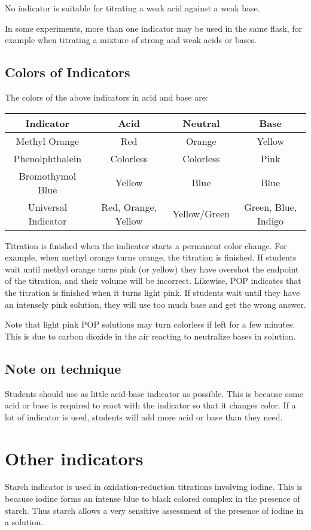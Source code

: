 No indicator is suitable for titrating a weak acid against a weak base.

In some experiments, more than one indicator may be used in the same flask, for example when titrating a mixture of strong and weak acids or bases.

\subsection{Colors of Indicators}
The colors of the above indicators in acid and base are:

\begin{center}
\begin{tabular}{ c | c | c | c |}
\hline
Indicator & Acid & Neutral & Base \\ \hline
Methyl Orange & Red & Orange & Yellow \\ \hline
Phenolphthalein & Colorless & Colorless & Pink \\ \hline
Bromothymol Blue & Yellow & Blue & Blue \\ \hline
Universal Indicator & Red, Orange, Yellow & Yellow/Green & Green, Blue, Indigo  \\
\hline
\end{tabular}
\end{center}

Titration is finished when the indicator starts a permanent color change. For example, when methyl orange turns orange, the titration is finished. If students wait until methyl orange turns pink (or yellow) they have overshot the endpoint of the titration, and their volume will be incorrect. Likewise, POP indicates that the titration is finished when it turns light pink. If students wait until they have an intensely pink solution, they will use too much base and get the wrong answer. 

Note that light pink POP solutions may turn colorless if left for a few minutes. This is due to carbon dioxide in the air reacting to neutralize bases in solution.

\subsection{Note on technique}
Students should use as little acid-base indicator as possible. This is because some acid or base is required to react with the indicator so that it changes color. If a lot of indicator is used, students will add more acid or base than they need.

\section{Other indicators}
Starch indicator is used in oxidation-reduction titrations involving iodine. This is because iodine forms an intense blue to black colored complex in the presence of starch. Thus starch allows a very sensitive assessment of the presence of iodine in a solution.

